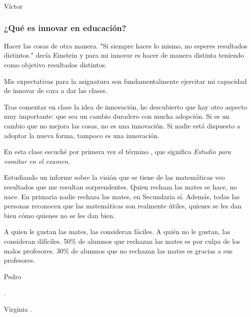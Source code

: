 \begin{opin}{\victorcolor}{Víctor}

\subsubsection{¿Qué es innovar en educación?}

Hacer las cosas de otra manera. "Si siempre haces lo mismo, no esperes resultados distintos." decía Einstein y para mi innovar es hacer de manera distinta teniendo como objetivo resultados distintos.

Mis expectativas para la asignatura son fundamentalmente ejercitar mi capacidad de innovar de cara a dar las clases. 

Tras comentar en clase la idea de innovación, he descubierto que hay otro aspecto muy importante: que sea un cambio duradero con mucha adopción.
%
Si es un cambio que no mejora las cosas, no es una innovación. 
%
Si nadie está dispuesto a adoptar la nueva forma, tampoco es una innovación.

En esta clase escuché por primera vez el término , que significa \textit{Estudio para vomitar en el examen}.



Estudiando un informe sobre la visión que se tiene de las matemáticas veo resultados que me resultan sorprendentes. 
%
Quien rechaza las mates se hace, no nace. En primaria nadie rechaza las mates, en Secundaria sí.
%
Además, todas las personas reconocen que las matemáticas son realmente útiles, quienes se les dan bien cómo quienes no se les dan bien.

A quien le gustan las mates, las consideran fáciles. A quién no le gustan, las consideran difíciles. 50\% de alumnos que rechazan las mates es por culpa de los malos profesores. 30\% de alumnos que no rechazan las mates es gracias a sus profesores. 


\end{opin}

\begin{opin}{\pedrocolor}{Pedro}

.


\end{opin}

\begin{opin}{\virgicolor}{Virginia}
.


\end{opin}
